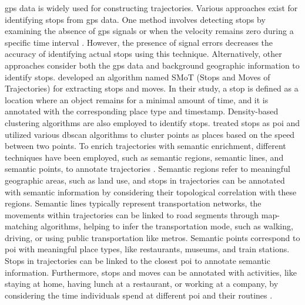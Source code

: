 \documentclass{article}
\theoremstyle{remark}
\begin{document}
\acrfull{gps} data is widely used for constructing trajectories. Various approaches exist for identifying stops from \acrshort{gps} data. One method involves detecting stops by examining the absence of \acrshort{gps} signals or when the velocity remains zero during a specific time interval \citep{ashbrook_using_2003}. However, the presence of signal errors decreases the accuracy of identifying actual stops using this technique. Alternatively, other approaches consider both the \acrshort{gps} data and background geographic information to identify stops. \cite{alvares_model_2007} developed an algorithm named SMoT (Stops and Moves of Trajectories) for extracting stops and moves. In their study, a stop is defined as a location where an object remains for a minimal amount of time, and it is annotated with the corresponding place type and timestamp. Density-based clustering algorithms are also employed to identify stops. \cite{palma_clustering-based_2008} treated stops as \acrshort{poi} and utilized various \acrshort{dbscan} algorithms to cluster points as places based on the speed between two points. To enrich trajectories with semantic enrichment, different techniques have been employed, such as semantic regions, semantic lines, and semantic points, to annotate trajectories \citep{yan_semantic_2013}. Semantic regions refer to meaningful geographic areas, such as land use, and stops in trajectories can be annotated with semantic information by considering their topological correlation with these regions. Semantic lines typically represent transportation networks, the movements within trajectories can be linked to road segments through map-matching algorithms, helping to infer the transportation mode, such as walking, driving, or using public transportation like metros. Semantic points correspond to \acrshort{poi} with meaningful place types, like restaurants, museums, and train stations. Stops in trajectories can be linked to the closest \acrshort{poi} to annotate semantic information. Furthermore, stops and moves can be annotated with activities, like staying at home, having lunch at a restaurant, or working at a company, by considering the time individuals spend at different \acrshort{poi} and their routines \cite{parent_semantic_2013}.
\end{document}
